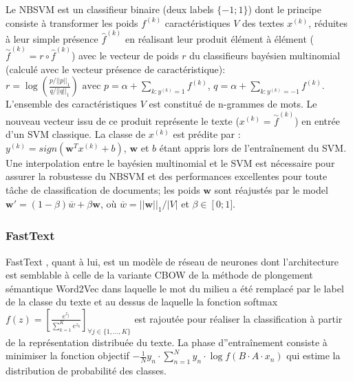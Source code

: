 Le NBSVM \citep{wang2012nbsvm} est un classifieur binaire (deux labels $\lbrace -1; 1 \rbrace$) dont le principe consiste à transformer les poids $f^{(k)}$ caractéristiques $V$ des textes $x^{(k)}$, réduites à leur simple présence $\widehat{f}^{(k)}$ en réalisant leur produit élément à élément ($\overset{\sim}{f}^{(k)} = {r} \circ \widehat{f}^{(k)}$) avec le vecteur de poids $r$ du classifieurs bayésien multinomial (calculé avec le vecteur présence de caractéristique):
$r = \log \left( \frac{p/\vert\vert p \vert\vert_1}{q / \vert\vert q \vert\vert_1}\right)
\text{ avec } p=\alpha + \sum\limits_{k:y^{(k)}=1}{f}^{(k)}$, $q=\alpha + \sum\limits_{k:y^{(k)}=-1}{f}^{(k)}$. L'ensemble des caractéristiques $V$ est constitué de n-grammes de mots. Le nouveau vecteur issu de ce produit représente le texte ($x^{(k)} = \overset{\sim}{f}^{(k)}$) en entrée d'un SVM classique. La classe de $x^{(k)}$ est prédite par : $y^{(k)} = sign(\mathbf{w}^Tx^{(k)} + b)$, $\mathbf{w}$ et $b$ étant appris lors de l'entraînement du SVM. Une interpolation  entre le bayésien multinomial et le SVM est nécessaire pour assurer la robustesse du NBSVM et des performances excellentes pour toute tâche de classification de documents; les poids $\mathbf{w}$ sont réajustés par le model $\mathbf{w'} = (1 - \beta) \overline{w} + \beta \mathbf{w}$, où $\overline{w} = \vert\vert \mathbf{w}\vert\vert_1 / \vert V \vert$ et $\beta \in \left[0; 1] \right.$. 
  

\subsubsection{FastText}
  
 FastText \citep{grave2017fasttextcls}, quant à lui, est un modèle de réseau de neurones dont l'architecture est semblable à celle de la variante CBOW de la méthode de plongement sémantique Word2Vec dans laquelle le mot du milieu a été remplacé par le label de la classe du texte et au dessus de laquelle la fonction softmax $f(z) = \left[ \frac{e^{z_j}}{\sum\limits_{k=1}^K e^{z_k}} \right]_{\forall j \in \lbrace 1, ..., K \rbrace} $ est rajoutée pour réaliser la classification à partir de la représentation distribuée du texte. La phase d''entraînement consiste à minimiser la fonction objectif $-\frac{1}{N}y_n \cdot \sum\limits_{n=1}^N y_n \cdot \log{f(B\cdot A\cdot x_n)}$ qui estime la distribution de probabilité des classes.


